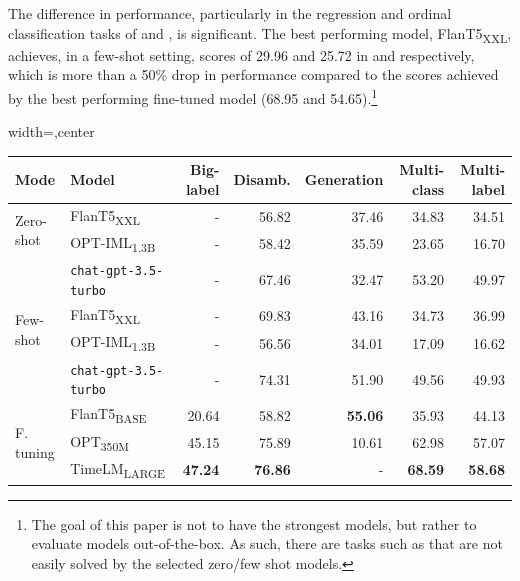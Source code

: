 The difference in performance, particularly in the regression and ordinal classification tasks of {\TweetIntimacy} and {\TweetSentiment}, is significant. The best performing model, FlanT5\textsubscript{XXL}, achieves, in a few-shot setting, scores of 29.96 and 25.72 in {\TweetIntimacy} and {\TweetSentiment} respectively, which is more than a 50\% drop in performance compared to the scores  achieved by the best performing fine-tuned model (68.95 and 54.65).\footnote{The goal of this paper is not to have the strongest models, but rather to evaluate models out-of-the-box. As such, there are tasks such as {\TweetEmoji} that are not easily solved by the selected zero/few shot models.}



\begin{table}[h]
\begin{adjustbox}{width=\textwidth,center}
\begin{tabular}{@{}llrrrrr@{}} \toprule
Mode & Model  & Big-label & Disamb. & Generation & Multi-class & Multi-label \\ \midrule
\multirow[t]{2}{*}{Zero-shot} & FlanT5\textsubscript{XXL} & - & 56.82 & 37.46 & 34.83 & 34.51 \\
 & OPT-IML\textsubscript{1.3B} & - & 58.42 & 35.59 & 23.65 & 16.70 \\
 & \texttt{chat-gpt-3.5-turbo} & - & 67.46 & 32.47 & 53.20 &  49.97 \\
\midrule
\multirow[t]{2}{*}{Few-shot} & FlanT5\textsubscript{XXL} & - & 69.83 & 43.16 & 34.73 & 36.99 \\
 & OPT-IML\textsubscript{1.3B} & - & 56.56 & 34.01 & 17.09 & 16.62 \\
 & \texttt{chat-gpt-3.5-turbo} & - & 74.31 & 51.90 & 49.56 & 49.93 \\
\midrule
\multirow[t]{3}{*}{F. tuning} & FlanT5\textsubscript{BASE} & 20.64 & 58.82 & \textbf{55.06} & 35.93 & 44.13 \\
 & OPT\textsubscript{350M} & 45.15 & 75.89 & 10.61 & 62.98 & 57.07 \\
 & TimeLM\textsubscript{LARGE} & \textbf{47.24} & \textbf{76.86} & - & \textbf{68.59} & \textbf{58.68} \\
\bottomrule
\end{tabular}
\end{adjustbox}


\end{table}
